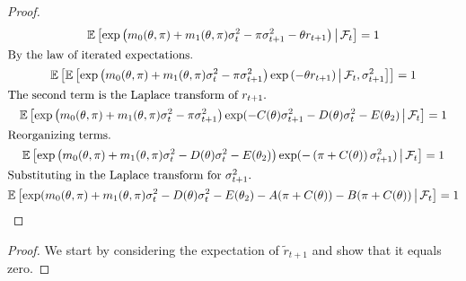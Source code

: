 \documentclass[11pt, letterpaper, twoside, final]{article}
\begin{document}
\begin{appendices}
\begin{proof}
\begin{gather}
    \E\left[\exp\left(m_0(\theta, \pi) + m_1(\theta, \pi) \sigma^2_t - \pi \sigma^2_{t+1} - \theta r_{t+1}
    \right) \mvert \F_t \right] = 1 \\
%
    \intertext{By the law of iterated expectations.}
%
    \E\left[ \E\left[\exp\left(m_0(\theta, \pi) + m_1(\theta, \pi) \sigma^2_t - \pi \sigma^2_{t+1}\right)
        \exp\left( - \theta r_{t+1}\right) \mvert \F_t, \sigma^2_{t+1} \right]\right] = 1 \\
%
    \intertext{The second term is the Laplace transform of $r_{t+1}$.}
%
    \E\left[\exp\left(m_0(\theta, \pi) + m_1(\theta, \pi) \sigma^2_t - \pi \sigma^2_{t+1} \right)
        \exp(-C(\theta) \sigma^2_{t+1} - D(\theta) \sigma^2_{t} - E(\theta_2) \mvert \F_t \right] = 1 \\
%
    \intertext{Reorganizing terms.}
%
    \E\left[\exp\left(m_0(\theta, \pi) + m_1(\theta, \pi) \sigma^2_t - D(\theta) \sigma^2_{t} - E(\theta_2)
    \right) \exp(-\left(\pi + C(\theta)\right) \sigma^2_{t+1}) \mvert \F_t \right] = 1 \\ 
%
    \intertext{Substituting in the Laplace transform for $\sigma^2_{t+1}$.} 
%
    \label{eqn:expected_sdf_wrt_PP}
    \E\left[\exp(m_0(\theta, \pi) + m_1(\theta, \pi) \sigma^2_t - D(\theta) \sigma^2_{t} - E(\theta_2)  - A(\pi +
    C(\theta)) - B(\pi + C(\theta)) \mvert \F_t \right] = 1 
\end{gather}

\end{proof}

\leverageVersusMeasureChange*


\begin{proof}

    We start by considering the expectation of $\widetilde{r}_{t+1}$ and show that it equals zero.


\end{proof}
\end{appendices}
\end{document}
